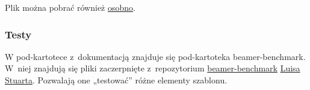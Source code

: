 Plik można pobrać również \href{https://myszka.kmim.wm.pwr.edu.pl/uploads/latex/oficyna_url.bst}{osobno}.

\subsubsection{Testy}

W pod-kartotece z~dokumentacją znajduje się pod-kartoteka beamer-benchmark. W~niej znajdują się pliki zaczerpnięte z~repozytorium \href{https://github.com/louisstuart96/beamer-benchmark}{beamer-benchmark} \href{https://github.com/louisstuart96}{Luisa Stuarta}. Pozwalają one „testować” różne elementy szablonu.

%


%



